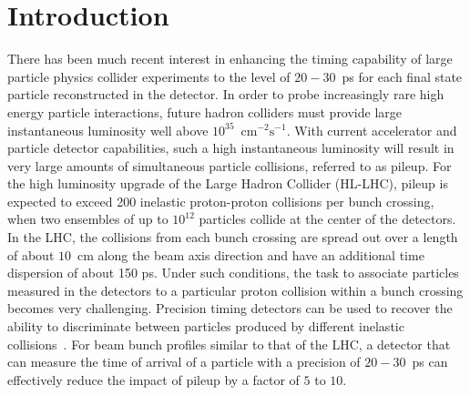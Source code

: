\section{Introduction} 

There has been much recent interest in enhancing the timing capability of large 
particle physics collider experiments to the level of $20-30$~ps for each final state particle
reconstructed in the detector. In order to probe increasingly rare high energy particle 
interactions, future hadron colliders must provide large 
instantaneous luminosity well above $10^{35}$~$\mathrm{cm}^{-2}\mathrm{s}^{-1}$.
With current accelerator and particle detector capabilities, such a high 
instantaneous luminosity will result in very large amounts
of simultaneous particle collisions, referred to as pileup. 
For the high luminosity upgrade of the Large Hadron Collider (HL-LHC), pileup is expected to 
exceed 200 inelastic proton-proton collisions per bunch crossing, when two ensembles
of up to $10^{12}$ particles collide at the center of the detectors.
In the LHC, the collisions from each bunch crossing are spread out over a length of about $10$~cm 
along the beam axis direction and have an additional time dispersion of about 150 ps.
Under such conditions, the task to associate particles measured in the detectors to a particular 
proton collision within a bunch crossing becomes very challenging. 
Precision timing detectors can be used to recover the ability to 
discriminate between particles produced by different inelastic collisions~\cite{adielba}.
For beam bunch profiles similar to that of the LHC, a detector that can measure the 
time of arrival of a particle with a precision of $20-30$~ps can effectively reduce the impact of
pileup by a factor of $5$ to $10$. 

